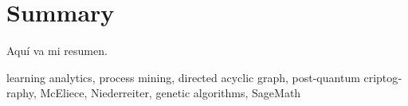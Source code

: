 \chapter*{Summary}

\begin{otherlanguage}{english}

Aquí va mi resumen.

\small{ learning analytics, \; process mining, \; directed acyclic graph, \; post-quantum criptography, \; McEliece, \; Niederreiter, \; genetic algorithms, \; SageMath}

\end{otherlanguage}
